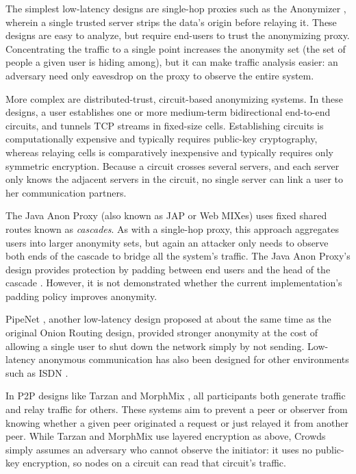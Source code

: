 \documentclass[times,10pt,twocolumn]{article}
\begin{document}
The simplest low-latency designs are single-hop proxies such as the
Anonymizer \cite{anonymizer}, wherein a single trusted server strips the
data's origin before relaying it.  These designs are easy to
analyze, but require end-users to trust the anonymizing proxy. 
Concentrating the traffic to a single point increases the anonymity set
(the set of people a given user is hiding among), but it can make traffic
analysis easier: an adversary need only eavesdrop on the proxy to observe
the entire system.

More complex are distributed-trust, circuit-based anonymizing systems.
In these designs, a user establishes one or more medium-term bidirectional
end-to-end circuits, and tunnels TCP streams in fixed-size cells.
Establishing circuits is computationally expensive and typically
requires public-key
cryptography, whereas relaying cells is comparatively inexpensive and
typically requires only symmetric encryption.
Because a circuit crosses several servers, and each server only knows
the adjacent servers in the circuit, no single server can link a
user to her communication partners.

The Java Anon Proxy (also known as JAP or Web MIXes) uses fixed shared
routes known as \emph{cascades}.  As with a single-hop proxy, this
approach aggregates users into larger anonymity sets, but again an
attacker only needs to observe both ends of the cascade to bridge all
the system's traffic.  The Java Anon Proxy's design provides
protection by padding between end users and the head of the cascade
\cite{web-mix}. However, it is not demonstrated whether the current
implementation's padding policy improves anonymity.

PipeNet \cite{back01, pipenet}, another low-latency design proposed at
about the same time as the original Onion Routing design, provided
stronger anonymity at the cost of allowing a single user to shut
down the network simply by not sending.  Low-latency anonymous
communication has also been designed for other environments such as
ISDN \cite{isdn-mixes}.

In P2P designs like Tarzan \cite{tarzan:ccs02} and MorphMix
\cite{morphmix:fc04}, all participants both generate traffic and relay
traffic for others. These systems aim to prevent a peer
or observer from knowing whether a given peer originated a request
or just relayed it from another peer. While Tarzan and MorphMix use
layered encryption as above, Crowds \cite{crowds-tissec} simply assumes
an adversary who cannot observe the initiator: it uses no public-key
encryption, so nodes on a circuit can read that circuit's traffic.
\end{document}
